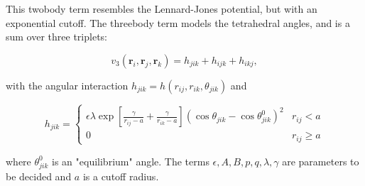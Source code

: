 This twobody term resembles the Lennard-Jones potential,
but with an exponential cutoff.
The threebody term models the tetrahedral angles,
and is a sum over three triplets:

\begin{equation}
    v_3(\bm{r}_i, \bm{r}_j, \bm{r}_k) = h_{jik} + h_{ijk} + h_{ikj} ,
\end{equation}

with the angular interaction $h_{jik} = h(r_{ij}, r_{ik}, \theta_{jik})$ and

\begin{equation}
    h_{jik} =
    \begin{cases}
        \epsilon \lambda \exp \left[ \frac{\gamma}{r_{ij} - a}
        + \frac{\gamma}{r_{ik} - a} \right]
        \left(\cos{\theta_{jik}} - \cos{\theta_{jik}^0} \right)^2 & r_{ij} < a \\
        0 & r_{ij} \geq a
    \end{cases}
\end{equation}

where $\theta_{jik}^0$ is an "equilibrium" angle.
The terms $\epsilon, A, B, p, q, \lambda, \gamma$ are parameters
to be decided and $a$ is a cutoff radius.
